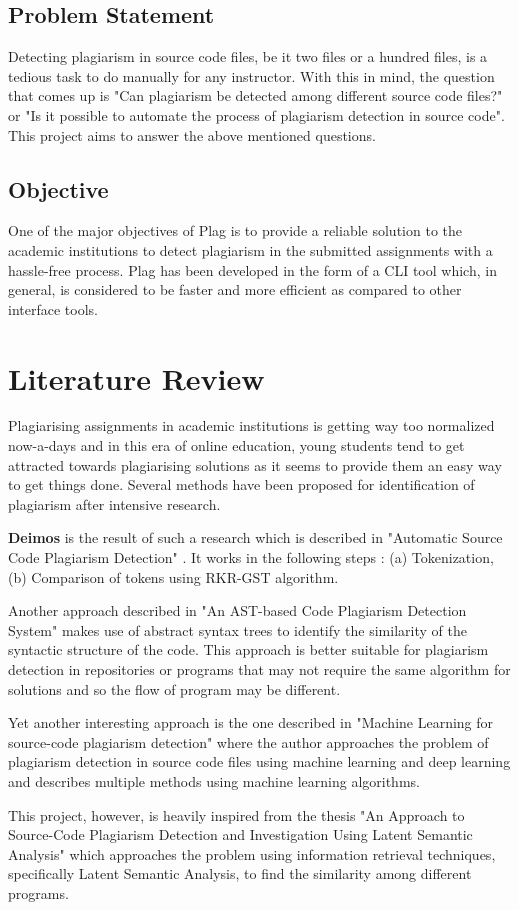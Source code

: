 \documentclass[12pt]{article}
\begin{document}
\subsection{Problem Statement}
Detecting plagiarism in source code files, be it two files or a hundred files, is a tedious task to do manually for any instructor. With this in mind, the question that comes up is "Can plagiarism be detected among different source code files?" or "Is it possible to automate the process of plagiarism detection in source code". This project aims to answer the above mentioned questions.

\subsection{Objective}
One of the major objectives of Plag is to provide a reliable solution to the academic institutions to detect plagiarism in the submitted assignments with a hassle-free process. Plag has been developed in the form of a CLI tool which, in general, is considered to be faster and more efficient as compared to other interface tools. \par


\section{Literature Review}
Plagiarising assignments in academic institutions is getting way too normalized now-a-days and in this era of online education, young students tend to get attracted towards plagiarising solutions as it seems to provide them an easy way to get things done. Several methods have been proposed for identification of plagiarism after intensive research. \par \textbf{Deimos} is the result of such a research which is described in "Automatic Source Code Plagiarism Detection" \cite{article}. It works in the following steps : (a) Tokenization, (b) Comparison of tokens using RKR-GST  algorithm. \par
Another approach described in "An AST-based Code Plagiarism Detection System" \cite{5286623} makes use of abstract syntax trees to identify the similarity of the syntactic structure of the code. This approach is better suitable for plagiarism detection in repositories or programs that may not require the same algorithm for solutions and so the flow of program may be different. \par
Yet another interesting approach is the one described in "Machine Learning for source-code plagiarism detection" \cite{8575900} where the author approaches the problem of plagiarism detection in source code files using machine learning and deep learning and describes multiple methods using machine learning algorithms. \par
This project, however, is heavily inspired from the thesis "An Approach to Source-Code Plagiarism Detection and Investigation Using Latent Semantic Analysis" \cite{6086533} which approaches the problem using information retrieval techniques, specifically Latent Semantic Analysis, to find the similarity among different programs.
\end{document}
